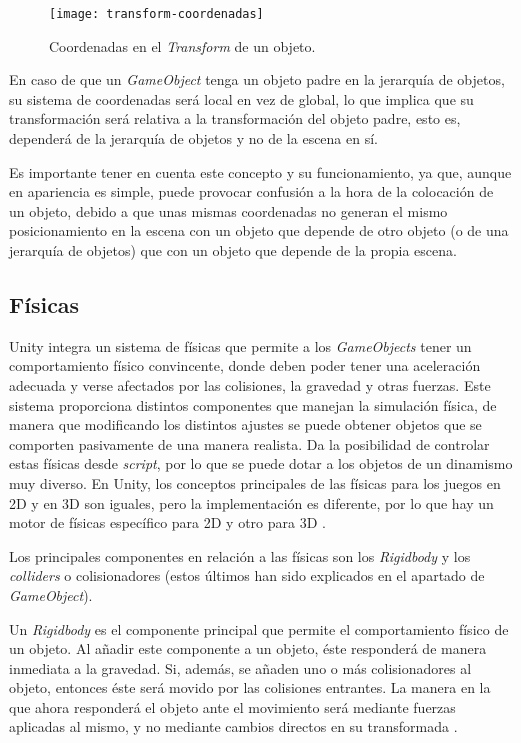 \begin{figure}[h]
	\centering
	\texttt{[image: transform-coordenadas]}
	\caption{Coordenadas en el \textit{Transform} de un objeto.}
	\label{fig:transform-coordenadas}
\end{figure}

En caso de que un \textit{GameObject} tenga un objeto padre en la jerarquía de objetos, su sistema de coordenadas será local en vez de global, lo que implica que su transformación será relativa a la transformación del objeto padre, esto es, dependerá de la jerarquía de objetos y no de la escena en sí.

Es importante tener en cuenta este concepto y su funcionamiento, ya que, aunque en apariencia es simple, puede provocar confusión a la hora de la colocación de un objeto, debido a que unas mismas coordenadas no generan el mismo posicionamiento en la escena con un objeto que depende de otro objeto (o de una jerarquía de objetos) que con un objeto que depende de la propia escena.

\subsection{Físicas}

Unity integra un sistema de físicas que permite a los \textit{GameObjects} tener un comportamiento físico convincente, donde deben poder tener una aceleración adecuada y verse afectados por las colisiones, la gravedad y otras fuerzas. Este sistema proporciona distintos componentes que manejan la simulación física, de manera que modificando los distintos ajustes se puede obtener objetos que se comporten pasivamente de una manera realista. Da la posibilidad de controlar estas físicas desde \textit{script}, por lo que se puede dotar a los objetos de un dinamismo muy diverso. En Unity, los conceptos principales de las físicas para los juegos en 2D y en 3D son iguales, pero la implementación es diferente, por lo que hay un motor de físicas específico para 2D y otro para 3D \cite{doc:physics}.

Los principales componentes en relación a las físicas son los \textit{Rigidbody} y los \textit{colliders} o colisionadores (estos últimos han sido explicados en el apartado de \textit{GameObject}). 

Un \textit{Rigidbody} es el componente principal que permite el comportamiento físico de un objeto. Al añadir este componente a un objeto, éste responderá de manera inmediata a la gravedad. Si, además, se añaden uno o más colisionadores al objeto, entonces éste será movido por las colisiones entrantes. La manera en la que ahora responderá el objeto ante el movimiento será mediante fuerzas aplicadas al mismo, y no mediante cambios directos en su transformada \cite{doc:rigidbody}.


